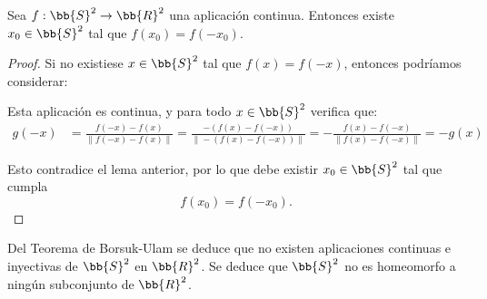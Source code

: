\begin{teo}
    Sea $f:\bb{S}^2 \to \bb{R}^2$ una aplicación continua. Entonces existe $x_0\in \bb{S}^2$ tal que $f(x_0)=f(-x_0)$.

    \begin{proof}
        Si no existiese $x\in \bb{S}^2$ tal que $f(x)=f(-x)$, entonces podríamos considerar:

        Esta aplicación es continua, y para todo $x\in \bb{S}^2$ verifica que:
        \begin{align*}
            g(-x) &= \frac{f(-x)-f(x)}{\|f(-x)-f(x)\|} = \frac{-(f(x)-f(-x))}{\|-(f(x)-f(-x))\|} = -\frac{f(x)-f(-x)}{\|f(x)-f(-x)\|} = -g(x)
        \end{align*}

        Esto contradice el lema anterior, por lo que debe existir $x_0\in \bb{S}^2$ tal que cumpla $$f(x_0)=f(-x_0).$$
    \end{proof}
\end{teo}

\begin{observacion}
    Del Teorema de Borsuk-Ulam se deduce que no existen aplicaciones continuas e inyectivas de $\bb{S}^2$ en $\bb{R}^2$. Se deduce que $\bb{S}^2$ no es homeomorfo a ningún subconjunto de $\bb{R}^2$.
\end{observacion}

